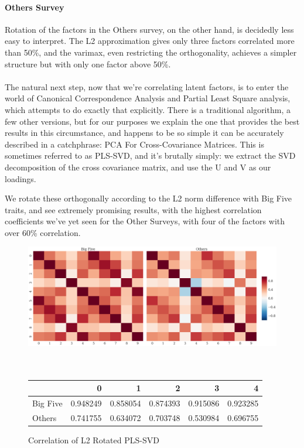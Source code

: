 \documentclass[a4paper,12pt]{article}
\begin{document}
\paragraph{Others Survey}
Rotation of the factors in the Others survey, on the other hand, is decidedly less easy to interpret. The L2 approximation gives only three factors correlated more than 50\%, and the varimax, even restricting the orthogonality, achieves a simpler structure but with only one factor above 50\%.
\\
\\
The natural next step, now that we're correlating latent factors, is to enter the world of Canonical Correspondence Analysis and Partial Least Square analysis, which attempts to do exactly that explicitly. There is a traditional algorithm, a few other versions, but for our purposes we explain the one that provides the best results in this circumstance, and happens to be so simple it can be accurately described in a catchphrase: PCA For Cross-Covariance Matrices. This is sometimes referred to as PLS-SVD, and it's brutally simply: we extract the SVD decomposition of the cross covariance matrix, and use the U and V as our loadings.

We rotate these orthogonally according to the L2 norm difference with Big Five traits, and see extremely promising results, with the highest correlation coefficients we've yet seen for the Other Surveys, with four of the factors with over 60\% correlation.

\begin{figure}
\includegraphics[width=\linewidth]{images/cross_svd.png}
\\
\\
\\
\begin{tabular}{lrrrrr}
\toprule
{} &         0 &         1 &         2 &         3 &         4 \\
\midrule
Big Five &  0.948249 &  0.858054 &  0.874393 &  0.915086 &  0.923285 \\
Others   &  0.741755 &  0.634072 &  0.703748 &  0.530984 &  0.696755 \\
\bottomrule
\end{tabular}
\caption{Correlation of L2 Rotated PLS-SVD}\label{fig:pls-svd}
\end{figure}
\end{document}
